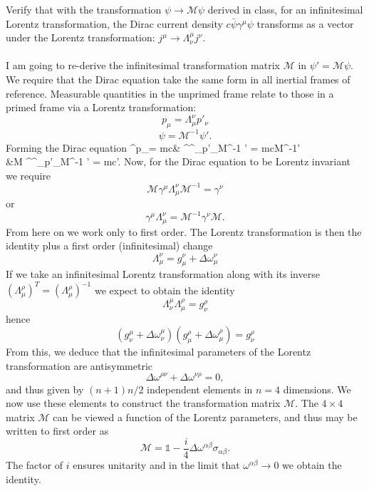 \documentclass[10pt,letterpaper]{article}
\begin{document}
	\benum
	\item 
	Verify that with the transformation $\psi \to \mathcal M\psi$ derived in class, for an infinitesimal Lorentz
	transformation, the Dirac current density $c\bar\psi\gamma^\mu \psi$ transforms as a vector under the 
	Lorentz transformation: $j^\mu \to \Lambda^\mu_\nu j^\nu$.
	\\ \\
	I am going to re-derive the infinitesimal transformation matrix $\mathcal M$ in $\psi' = \mathcal M\psi$. \\
	We require that the Dirac equation take the same form in all inertial frames of reference. Measurable
	quantities in the unprimed frame relate to those in a primed frame via a Lorentz transformation:
	\[
		p_\mu = \Lambda_\mu^\nu p'_\nu
	\]
	\[
		\psi = \mathcal M^{-1} \psi'. 
	\]
	Forming the Dirac equation
	\ba
		\gamma^\mu p_\mu \psi = mc\psi &\quad\Rightarrow\quad 
		\gamma^\mu \Lambda^\nu_\mu p'_\nu \mathcal M^{-1} \psi' = mc\mathcal M^{-1}\psi'\\
		&\quad\Rightarrow\quad \mathcal M \gamma^\mu \Lambda^\nu_\mu p'_\nu \mathcal M^{-1} \psi'
		 = mc\mathcal \psi'.
	\ea 
	Now, for the Dirac equation to be Lorentz invariant we require
	\[
		\mathcal M\gamma^\mu\Lambda_\mu^\nu \mathcal M^{-1} = \gamma^\nu
	\]
	or
	\[
		\gamma^\mu\Lambda^\nu_\mu = \mathcal M^{-1}\gamma^\nu \mathcal M\tag{5}.
	\]
	From here on we work only to first order. The Lorentz transformation is then the identity plus a first
	order (infinitesimal) change
	\[
		\Lambda^\nu_\mu = g_\mu^\nu +\Delta\omega_\mu^\nu
	\]
	If we take an infinitesimal Lorentz transformation along with its inverse
	$(\Lambda^\rho_\mu)^{T} = (\Lambda_\mu^\rho)^{-1}$ we expect to obtain the identity
	 \[
	 	\Lambda^\mu_\nu\Lambda_\mu^\rho = g_\nu^\rho
	\]
	hence
	\[
		(g^\mu_\nu+\Delta\omega_\nu^\mu)(g^\rho_\mu+\Delta\omega_\mu^\rho)
		= g_\nu^\rho
	\]
	From this, we deduce that the infinitesimal parameters of the Lorentz transformation
	are antisymmetric
	\[
		\Delta\omega^{\rho\nu}+\Delta\omega^{\nu\rho} = 0,
	\]
	and thus given by $(n+1)n/2$ independent elements in $n=4$ dimensions. We now use these elements
	to construct the transformation matrix $\mathcal M$. The $4\times 4$ matrix $\mathcal M$
	can be viewed a function of the Lorentz parameters, and thus may be written to first order as
	\[
		\mathcal M = \mathds 1 -\frac{i}{4}\Delta\omega^{\alpha\beta}\sigma_{\alpha\beta}.
	\]
	The factor of $i$ ensures unitarity and in the limit that $\omega^{\alpha\beta} \to 0$ we obtain
	the identity. 
	\\ \\
\end{document}
